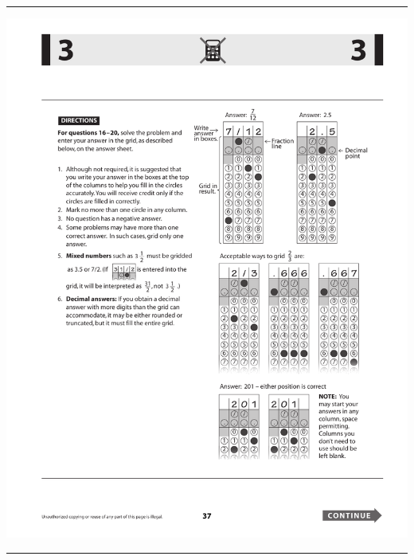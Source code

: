 
{\selectfont
\enlargethispage{2cm}

\hspace*{32mm}
\hrule height 1pt



\vspace*{4mm}

\includegraphics{support/sat_calcoff_grid-in_instructions.pdf}

\vspace*{4mm}

\hrule height 1pt
}

\clearpage

